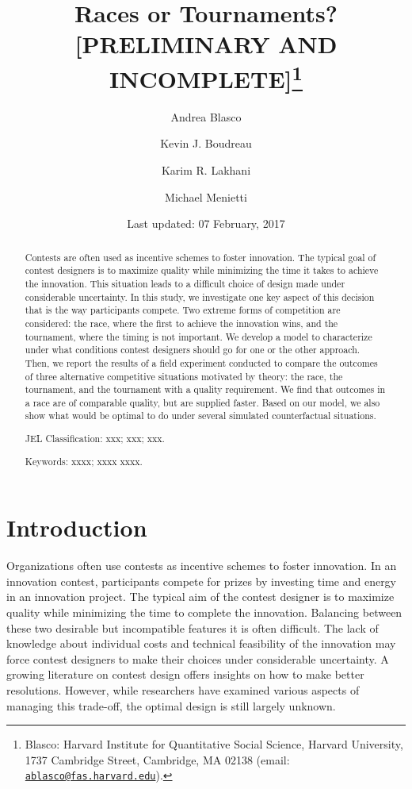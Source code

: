 \documentclass[12pt,]{article}
\title{Races or Tournaments? {[}PRELIMINARY AND INCOMPLETE{]}\thanks{Blasco: Harvard Institute for Quantitative Social Science, Harvard
University, 1737 Cambridge Street, Cambridge, MA 02138 (email:
\href{mailto:ablasco@fas.harvard.edu}{\nolinkurl{ablasco@fas.harvard.edu}}).}}
\author{Andrea Blasco \and Kevin J. Boudreau \and Karim R. Lakhani \and Michael Menietti}
\date{Last updated: 07 February, 2017}
\begin{document}
\maketitle
\begin{abstract}
Contests are often used as incentive schemes to foster innovation. The
typical goal of contest designers is to maximize quality while
minimizing the time it takes to achieve the innovation. This situation
leads to a difficult choice of design made under considerable
uncertainty. In this study, we investigate one key aspect of this
decision that is the way participants compete. Two extreme forms of
competition are considered: the race, where the first to achieve the
innovation wins, and the tournament, where the timing is not important.
We develop a model to characterize under what conditions contest
designers should go for one or the other approach. Then, we report the
results of a field experiment conducted to compare the outcomes of three
alternative competitive situations motivated by theory: the race, the
tournament, and the tournament with a quality requirement. We find that
outcomes in a race are of comparable quality, but are supplied faster.
Based on our model, we also show what would be optimal to do under
several simulated counterfactual situations.

\smallskip\noindent 
JEL Classification: xxx; xxx; xxx.

\smallskip\noindent 
Keywords: xxxx; xxxx xxxx.
\end{abstract}


\clearpage
\tableofcontents
\setcounter{tocdepth}{2}
\clearpage

\section{Introduction}\label{introduction}

Organizations often use contests as incentive schemes to foster
innovation. In an innovation contest, participants compete for prizes by
investing time and energy in an innovation project. The typical aim of
the contest designer is to maximize quality while minimizing the time to
complete the innovation. Balancing between these two desirable but
incompatible features it is often difficult. The lack of knowledge about
individual costs and technical feasibility of the innovation may force
contest designers to make their choices under considerable uncertainty.
A growing literature on contest design offers insights on how to make
better resolutions. However, while researchers have examined various
aspects of managing this trade-off, the optimal design is still largely
unknown.
\end{document}

